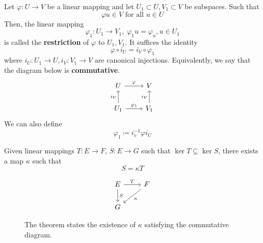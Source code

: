   \begin{definition}[Restriction]
    \label{def:restriction}
    Let $\varphi: U \to V$ be a linear mapping and let $U_1 \subset U, V_1 \subset V$ be subspaces. Such that 
    \begin{equation}
      \varphi u \in V \text{ for all } u \in U
    \end{equation}
    Then, the linear mapping 
    \begin{equation}
      \varphi_1: U_1 \to V_1, \; \varphi_1 u = \varphi_u, u \in U_1
    \end{equation}
    is called the \textbf{restriction} of $\varphi$ to $U_1, V_1$. It suffices the identity
    \begin{equation}
      \varphi \circ i_U = i_V \circ \varphi_1
    \end{equation}
    where $i_U: U_1 \to U, i_V: V_1 \to V$ are canonical injections. Equivalently, we say that the diagram below is \textbf{commutative}. 
    \begin{equation}
      \begin{tikzcd}
        U \arrow{r}{\varphi} & V \\
        U_1 \arrow{u}{i_U} \arrow{r}{\varphi_1} & V_1 \arrow{u}{i_V}
      \end{tikzcd}
    \end{equation}
    We can also define 
    \begin{equation}
      \varphi_1 \coloneqq i_v^{-1} \varphi i_U
    \end{equation}
  \end{definition}

  \begin{theorem}
		\label{thm:universal_quotient}
    Given linear mappings $T: E \to F$, $S: E \to G$ such that $\ker{T} \subseteq \ker{S}$, there exists a map $\kappa$ such that 
    \begin{equation}
      S = \kappa T
    \end{equation}

		\begin{figure}[H]
			\centering 
			\begin{equation}
			  \begin{tikzcd}
			  				E \arrow{r}{T} \arrow{d}{S} & F \arrow{dl}{\kappa} \\
			  				G
			  			\end{tikzcd}
			\end{equation}
			\caption{The theorem states the existence of $\kappa$ satisfying the commutative diagram.} 
			\label{fig:universal_prop_of_factorization}
		\end{figure}
  \end{theorem}

